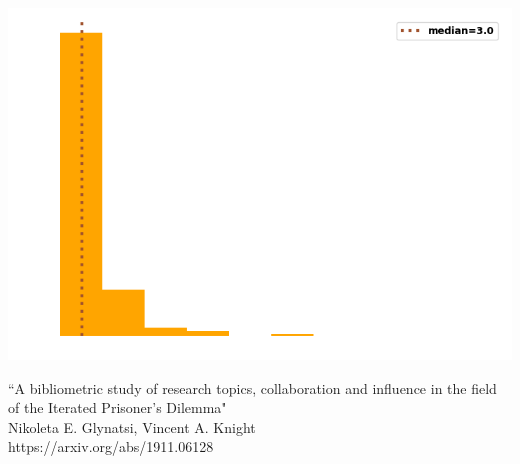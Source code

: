 \documentclass{beamer}
\begin{document}
\begin{frame}
    \begin{center}
    
    \end{center}
\end{frame}

\begin{frame}
    \begin{center}
    
    \end{center}
\end{frame}


\begin{frame}
    \begin{center}
        \includegraphics[width=.7\textwidth]{static/degree_dist.png}
    \end{center}
\end{frame}

\begin{frame}
    \begin{center}
        \large{``A bibliometric study of research topics, collaboration and influence in the field of the Iterated Prisoner's Dilemma"} \\ \vspace{.5cm}
        \footnotesize{Nikoleta E. Glynatsi, Vincent A. Knight} \\ \vspace{.5cm}
        \footnotesize{https://arxiv.org/abs/1911.06128}
    \end{center}
\end{frame}
\end{document}
